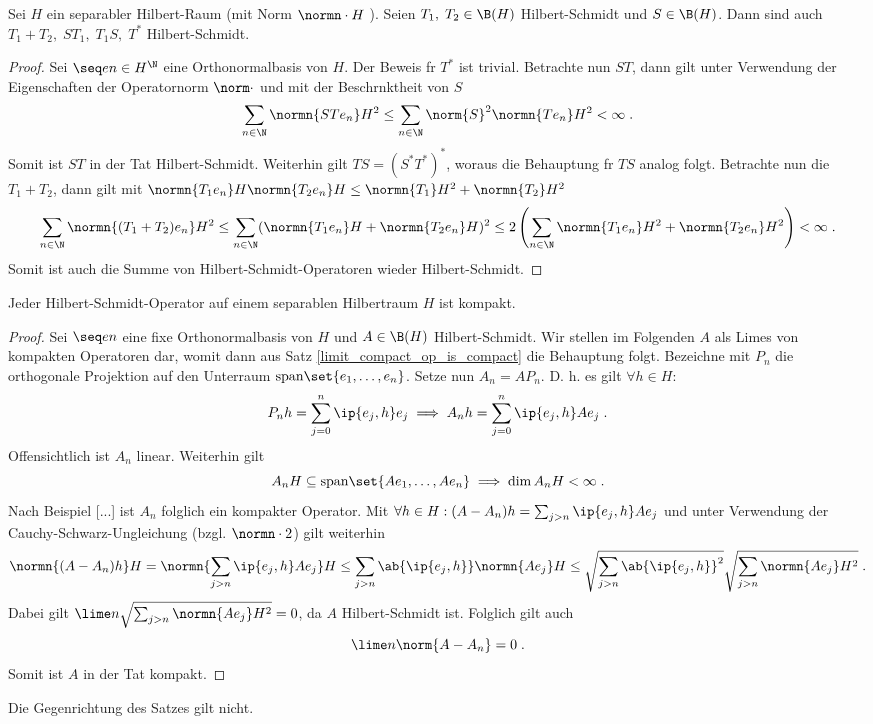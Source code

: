 \begin{theorem}
	Sei \(H\) ein separabler Hilbert-Raum (mit Norm \(\normn\cdot H\) ). Seien \(T_1, \;T_2\in \B(H) \) Hilbert-Schmidt und \(S\in \B(H)\). Dann sind auch \(T_1 + T_2,\; ST_1,\; T_1S,\; T^*\) Hilbert-Schmidt.
\end{theorem}
\begin{proof}
	Sei \(\seq en \in H^\N\) eine Orthonormalbasis von $H$.
	Der Beweis f\us r \(T^*\) ist trivial. Betrachte nun \(ST\), dann gilt unter Verwendung der Eigenschaften der Operatornorm \(\norm\cdot\) und mit der Beschr\as nktheit von $S$
	\[\sum_{n\in\N} \normn{STe_n}H^2 \leq \sum_{n\in\N} \norm{S}^2  \normn{Te_n}H^2 < \infty \;.\]
	Somit ist \(ST\) in der Tat Hilbert-Schmidt. Weiterhin gilt \(TS = (S^* T^*)^*\), woraus die Behauptung f\us r $TS$ analog folgt. Betrachte nun die \(T_1 + T_2\), dann gilt mit \(\normn{T_1 e_n}H \normn{T_2 e_n}H \leq \normn{T_1}H^2 + \normn{T_2}H^2\)
	\[\sum_{n\in\N} \normn{(T_1 + T_2)e_n}H^2 \leq \sum_{n\in\N} (\normn{T_1 e_n}H + \normn{T_2 e_n}H)^2 \leq 2 \left(\sum_{n\in\N} \normn{T_1 e_n}H^2 + \normn{T_2 e_n}H^2\right) < \infty\;.\]
	Somit ist auch die Summe von Hilbert-Schmidt-Operatoren wieder Hilbert-Schmidt.
\end{proof}

\begin{theorem}
	Jeder Hilbert-Schmidt-Operator auf einem separablen Hilbertraum $H$ ist kompakt.
\end{theorem}
\begin{proof}
	Sei \(\seq en\) eine fixe Orthonormalbasis von $H$ und \(A\in \B(H)\) Hilbert-Schmidt. Wir stellen im Folgenden \(A\) als Limes von kompakten Operatoren dar, womit dann aus Satz \ref{limit_compact_op_is_compact} die Behauptung folgt. 
	Bezeichne mit \(P_n\) die orthogonale Projektion auf den Unterraum \(\text{span}\set{e_1,\ldots,e_n}\). Setze nun \(A_n = A P_n\). D. h. es gilt \(\forall h \in H\):
	\[P_n h = \sum_{j=0}^n \ip{e_j, h} e_j \implies A_n h = \sum_{j=0}^n \ip{e_j, h} Ae_j\;.\]
	Offensichtlich ist \(A_n\) linear. Weiterhin gilt
	\[A_n H \subseteq \text{span}\set{Ae_1,\ldots,Ae_n} \implies \dim A_n H < \infty\;.\]
	Nach Beispiel [...] ist \(A_n\) folglich ein kompakter Operator.
	Mit \(\forall h \in H: (A-A_n)h = \sum_{j>n}\ip{e_j, h}Ae_j\) und unter Verwendung der Cauchy-Schwarz-Ungleichung (bzgl. \(\normn\cdot 2\)) gilt weiterhin
	\[\normn{(A-A_n)h}H = \normn{\sum_{j>n}\ip{e_j, h}Ae_j}H \leq \sum_{j>n} \ab{\ip{e_j, h}} \normn{Ae_j}H \leq \sqrt{\sum_{j>n} \ab{\ip{e_j, h}}^2} \sqrt{\sum_{j>n}\normn{Ae_j}H^2}\;.\]
	Dabei gilt \(\lime n  \sqrt{\sum_{j>n}\normn{Ae_j}H^2} = 0\), da $A$ Hilbert-Schmidt ist. Folglich gilt auch
	\[\lime n \norm{A-A_n} = 0\;.\]
	Somit ist $A$ in der Tat kompakt.
\end{proof}
\begin{rem}
	Die Gegenrichtung des Satzes gilt nicht.
\end{rem}

